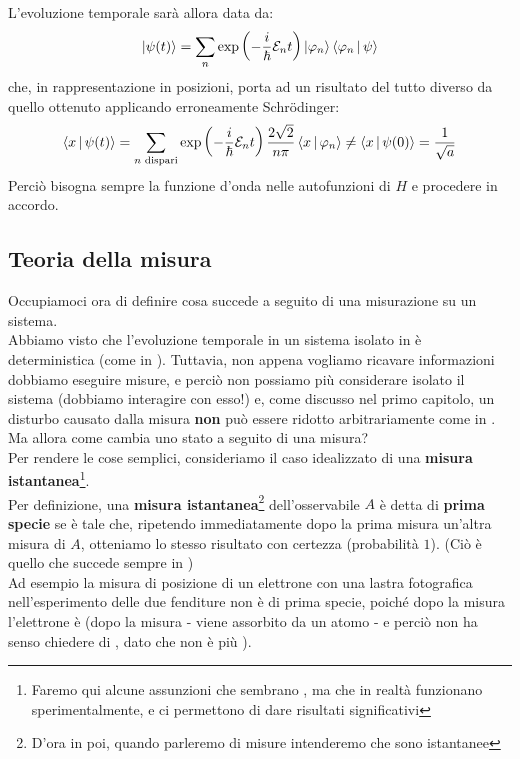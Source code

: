 \documentclass[../../FisicaTeorica.tex]{subfiles}
\begin{document}
L'evoluzione temporale sarà allora data da:
\[
\Ket{\psi(t)}=\sum_n \exp\left(-\frac{i}{\hbar}\mathcal{E}_n t\right) \Ket{\varphi_n} \Braket{\varphi_n|\psi}
\]
che, in rappresentazione in posizioni, porta ad un risultato del tutto diverso da quello ottenuto applicando erroneamente Schrödinger:
\[
\Braket{x|\psi(t)}=\sum_{n \text{ dispari}} \exp\left(-\frac{i}{\hbar}\mathcal{E}_n t \right)\frac{2\sqrt{2}}{n\pi}\Braket{x|\varphi_n}\neq \Braket{x|\psi(0)}=\frac{1}{\sqrt{a}}
\]
Perciò bisogna sempre  la funzione d'onda nelle autofunzioni di $H$ e procedere in accordo.\\

\subsection{Teoria della misura}
Occupiamoci ora di definire cosa succede a seguito di una misurazione su un sistema.\\
Abbiamo visto che l'evoluzione temporale in un sistema isolato in \MQ è deterministica (come in \MC). Tuttavia, non appena vogliamo ricavare informazioni dobbiamo eseguire misure, e perciò non possiamo più considerare isolato il sistema (dobbiamo interagire con esso!) e, come discusso nel primo capitolo, un disturbo causato dalla misura \textbf{non} può essere ridotto arbitrariamente come in \MC.\\
Ma allora come cambia uno stato a seguito di una misura?\\
Per rendere le cose semplici, consideriamo il caso idealizzato di una \textbf{misura istantanea}\footnote{Faremo qui alcune assunzioni che sembrano , ma che in realtà funzionano sperimentalmente, e ci permettono di dare risultati significativi}.\\
Per definizione, una \textbf{misura istantanea}\footnote{D'ora in poi, quando parleremo di misure intenderemo che sono istantanee} dell'osservabile $A$ è detta di \textbf{prima specie} se è tale che, ripetendo immediatamente dopo la prima misura un'altra misura di $A$, otteniamo lo stesso risultato con certezza (probabilità $1$). (Ciò è quello che succede sempre in \MC)\\
Ad esempio la misura di posizione di un elettrone con una lastra fotografica nell'esperimento delle due fenditure non è di prima specie, poiché dopo la misura l'elettrone è  (dopo la misura  - viene assorbito da un atomo - e perciò non ha senso chiedere di , dato che non è più ).\\
\end{document}

